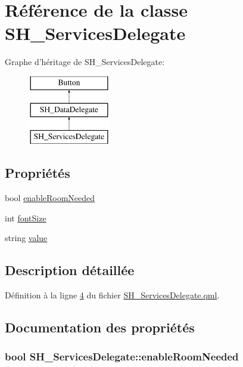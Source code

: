 \hypertarget{classSH__ServicesDelegate}{\section{Référence de la classe S\-H\-\_\-\-Services\-Delegate}
\label{classSH__ServicesDelegate}
}
Graphe d'héritage de S\-H\-\_\-\-Services\-Delegate\-:\begin{figure}[H]
\begin{center}
\leavevmode
\includegraphics[height=3.000000cm]{classSH__ServicesDelegate}
\end{center}
\end{figure}
\subsection*{Propriétés}
\begin{DoxyCompactItemize}
\item 
bool \hyperlink{classSH__ServicesDelegate_a8567cacba7b48a3c1f71e6fa6dfb9f74}{enable\-Room\-Needed}
\item 
int \hyperlink{classSH__DataDelegate_afbb41ad9b513c7f27e7b5ad90d82e95b}{font\-Size}
\item 
string \hyperlink{classSH__DataDelegate_acb9da3c73493c88865e08d9575f26482}{value}
\end{DoxyCompactItemize}


\subsection{Description détaillée}


Définition à la ligne \hyperlink{SH__ServicesDelegate_8qml_source_l00004}{4} du fichier \hyperlink{SH__ServicesDelegate_8qml_source}{S\-H\-\_\-\-Services\-Delegate.\-qml}.



\subsection{Documentation des propriétés}
\hypertarget{classSH__ServicesDelegate_a8567cacba7b48a3c1f71e6fa6dfb9f74}{
\subsubsection[{enable\-Room\-Needed}]{\setlength{\rightskip}{0pt plus 5cm}bool S\-H\-\_\-\-Services\-Delegate\-::enable\-Room\-Needed}}\label{classSH__ServicesDelegate_a8567cacba7b48a3c1f71e6fa6dfb9f74}


